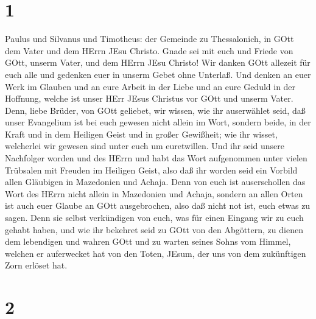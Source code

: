 \hypertarget{section}{%
\section{1}\label{section}}

 Paulus und Silvanus und Timotheus: der Gemeinde zu
Thessalonich, in GOtt dem Vater und dem HErrn JEsu Christo. Gnade sei
mit euch und Friede von GOtt, unserm Vater, und dem HErrn JEsu Christo!
 Wir danken GOtt allezeit für euch alle und gedenken euer in
unserm Gebet ohne Unterlaß.  Und denken an euer Werk im
Glauben und an eure Arbeit in der Liebe und an eure Geduld in der
Hoffnung, welche ist unser HErr JEsus Christus vor GOtt und unserm
Vater.  Denn, liebe Brüder, von GOtt geliebet, wir wissen,
wie ihr auserwählet seid,  daß unser Evangelium ist bei euch
gewesen nicht allein im Wort, sondern beide, in der Kraft und in dem
Heiligen Geist und in großer Gewißheit; wie ihr wisset, welcherlei wir
gewesen sind unter euch um euretwillen.  Und ihr seid unsere
Nachfolger worden und des HErrn und habt das Wort aufgenommen unter
vielen Trübsalen mit Freuden im Heiligen Geist,  also daß
ihr worden seid ein Vorbild allen Gläubigen in Mazedonien und Achaja.
 Denn von euch ist auserschollen das Wort des HErrn nicht
allein in Mazedonien und Achaja, sondern an allen Orten ist auch euer
Glaube an GOtt ausgebrochen, also daß nicht not ist, euch etwas zu
sagen.  Denn sie selbst verkündigen von euch, was für einen
Eingang wir zu euch gehabt haben, und wie ihr bekehret seid zu GOtt von
den Abgöttern, zu dienen dem lebendigen und wahren GOtt 
und zu warten seines Sohns vom Himmel, welchen er auferwecket hat von
den Toten, JEsum, der uns von dem zukünftigen Zorn erlöset hat.

\hypertarget{section-1}{%
\section{2}\label{section-1}}

